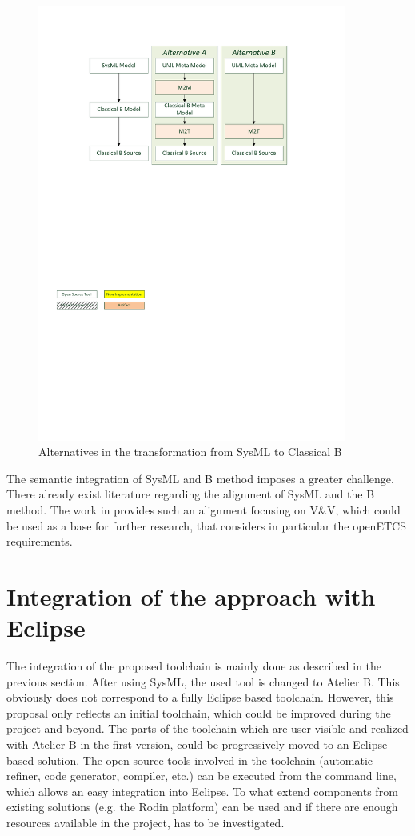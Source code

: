 \begin{figure}[b!]
  \centering
  \includegraphics[width=4in]{images/classical_b_transformation_alternatives.pdf}
  \caption{Alternatives in the transformation from SysML to Classical B}
  \label{fig:classical-b-transformation-alternatives}
\end{figure}

The semantic integration of SysML and B method imposes a greater
challenge. There already exist literature regarding the alignment of
SysML and the B method. The work in \citep{bousse}
provides such an alignment focusing on V\&V, which could be used as a
base for further research, that considers in particular the openETCS
requirements.


\section{Integration of the approach with Eclipse}

The integration of the proposed toolchain is mainly done as described
in the previous section. After using SysML, the used tool is changed
to Atelier B. This obviously does not correspond to a fully Eclipse
based toolchain. However, this proposal only reflects an initial
toolchain, which could be improved during the project and beyond. The
parts of the toolchain which are user visible and realized with
Atelier B in the first version, could be progressively moved to an
Eclipse based solution. The open source tools involved in the
toolchain (automatic refiner, code generator, compiler, etc.) can be
executed from the command line, which allows an easy integration into
Eclipse. To what extend components from existing solutions (e.g. the
Rodin platform) can be used and if there are enough resources
available in the project, has to be investigated.

